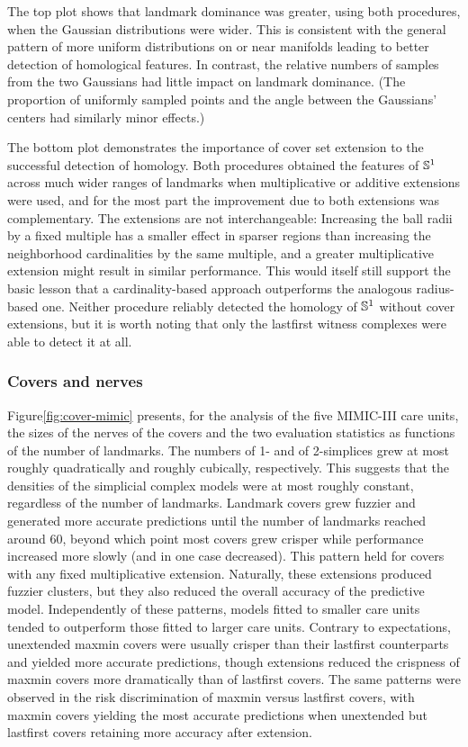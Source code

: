 \documentclass{article}
\begin{document}
The top plot shows that landmark dominance was greater, using both
procedures, when the Gaussian distributions were wider. This is
consistent with the general pattern of more uniform distributions on or
near manifolds leading to better detection of homological features. In
contrast, the relative numbers of samples from the two Gaussians had
little impact on landmark dominance. (The proportion of uniformly
sampled points and the angle between the Gaussians' centers had
similarly minor effects.)

The bottom plot demonstrates the importance of cover set extension to
the successful detection of homology. Both procedures obtained the
features of \(\mathbb{S}^1\) across much wider ranges of landmarks when
multiplicative or additive extensions were used, and for the most part
the improvement due to both extensions was complementary. The extensions
are not interchangeable: Increasing the ball radii by a fixed multiple
has a smaller effect in sparser regions than increasing the neighborhood
cardinalities by the same multiple, and a greater multiplicative
extension might result in similar performance. This would itself still
support the basic lesson that a cardinality-based approach outperforms
the analogous radius-based one. Neither procedure reliably detected the
homology of \(\mathbb{S}^1\) without cover extensions, but it is worth noting
that only the lastfirst witness complexes were able to detect it at all.

\hypertarget{covers-and-nerves-1}{%
\subsubsection{Covers and nerves}\label{covers-and-nerves-1}}

Figure\nbs\ref{fig:cover-mimic} presents, for the analysis of the five
MIMIC-III care units, the sizes of the nerves of the covers and the two
evaluation statistics as functions of the number of landmarks. The
numbers of 1- and of 2-simplices grew at most roughly quadratically and
roughly cubically, respectively. This suggests that the densities of the
simplicial complex models were at most roughly constant, regardless of
the number of landmarks. Landmark covers grew fuzzier and generated more
accurate predictions until the number of landmarks reached around 60,
beyond which point most covers grew crisper while performance increased
more slowly (and in one case decreased). This pattern held for covers
with any fixed multiplicative extension. Naturally, these extensions
produced fuzzier clusters, but they also reduced the overall accuracy of
the predictive model. Independently of these patterns, models fitted to
smaller care units tended to outperform those fitted to larger care
units. Contrary to expectations, unextended maxmin covers were usually
crisper than their lastfirst counterparts and yielded more accurate
predictions, though extensions reduced the crispness of maxmin covers
more dramatically than of lastfirst covers. The same patterns were
observed in the risk discrimination of maxmin versus lastfirst covers,
with maxmin covers yielding the most accurate predictions when
unextended but lastfirst covers retaining more accuracy after extension.
\end{document}

